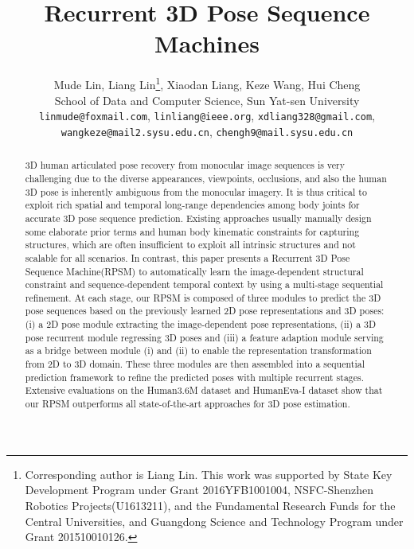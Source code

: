 \documentclass[10pt,twocolumn,letterpaper]{article}
\begin{document}
\title{Recurrent 3D Pose Sequence Machines}

\author{Mude Lin, \quad Liang Lin\thanks{Corresponding author is Liang Lin. This work was supported by State Key Development Program under Grant 2016YFB1001004, NSFC-Shenzhen Robotics Projects(U1613211), and the Fundamental Research Funds for the Central Universities, and Guangdong Science and Technology Program under Grant 201510010126.}, \quad Xiaodan Liang, \quad Keze Wang, \quad Hui Cheng\\
School of Data and Computer Science, Sun Yat-sen University\\
{\tt\small linmude@foxmail.com}, {\tt\small linliang@ieee.org}, {\tt\small xdliang328@gmail.com},\\{\tt\small wangkeze@mail2.sysu.edu.cn}, {\tt\small chengh9@mail.sysu.edu.cn}
}

\maketitle


\begin{abstract}3D human articulated pose recovery from monocular image sequences is very challenging due to the diverse appearances, viewpoints, occlusions, and also the human 3D pose is inherently ambiguous from the monocular imagery. It is thus critical to exploit rich spatial and temporal long-range dependencies among body joints for accurate 3D pose sequence prediction. Existing approaches usually manually design some elaborate prior terms and human body kinematic constraints for capturing structures, which are often insufficient to exploit all intrinsic structures and not scalable for all scenarios. In contrast, this paper presents a Recurrent 3D Pose Sequence Machine(RPSM) to automatically learn the image-dependent structural constraint and sequence-dependent temporal context by using a multi-stage sequential refinement. At each stage, our RPSM is composed of three modules to predict the 3D pose sequences based on the previously learned 2D pose representations and 3D poses: (i) a 2D pose module extracting the image-dependent pose representations, (ii) a 3D pose recurrent module regressing 3D poses and (iii) a feature adaption module serving as a bridge between module (i) and (ii) to enable the representation transformation from 2D to 3D domain. These three modules are then assembled into a sequential prediction framework to refine the predicted poses with multiple recurrent stages. Extensive evaluations on the Human3.6M dataset and HumanEva-I dataset show that our RPSM outperforms all state-of-the-art approaches for 3D pose estimation.
\end{abstract}
\end{document}
